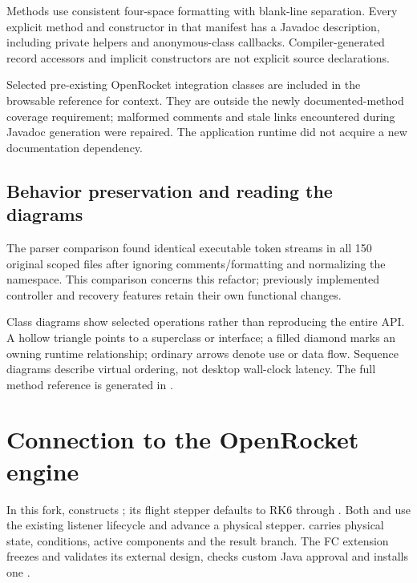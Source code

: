 Methods use consistent four-space formatting with blank-line separation.
Every explicit method and constructor in that manifest has a Javadoc description,
including private helpers and anonymous-class callbacks. Compiler-generated
record accessors and implicit constructors are not explicit source declarations.

Selected pre-existing OpenRocket integration classes are included in the
browsable reference for context. They are outside the newly documented-method
coverage requirement; malformed comments and stale links encountered during
Javadoc generation were repaired. The application runtime did not acquire a
new documentation dependency.

\subsection{Behavior preservation and reading the diagrams}
The parser comparison found identical executable token streams in all 150
original scoped files after ignoring comments/formatting and normalizing the
namespace. This comparison concerns this refactor; previously implemented
controller and recovery features retain their own functional changes.

Class diagrams show selected operations rather than reproducing the entire
API. A hollow triangle points to a superclass or interface; a filled diamond
marks an owning runtime relationship; ordinary arrows denote use or data flow.
Sequence diagrams describe virtual ordering, not desktop wall-clock latency.
The full method reference is generated in .

\clearpage
\section{Connection to the OpenRocket engine}
In this fork,  constructs ; its flight stepper defaults to RK6 through . Both 
and  use the existing listener lifecycle
and advance a physical stepper.  carries physical state,
conditions, active components and the result branch. The FC extension freezes
and validates its external design, checks custom Java approval and installs
one .

